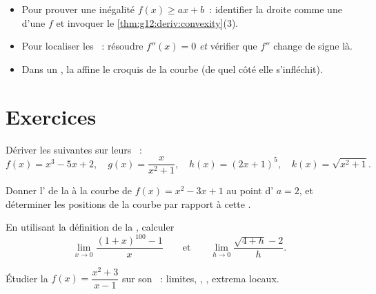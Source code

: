 \begin{method}\label{met:g12:deriv:convexity}
\begin{itemize}
  \item Pour prouver une inégalité $f(x) \geq ax + b$~: identifier la
        droite comme une  d'une   $f$ et invoquer le
        \cref{thm:g12:deriv:convexity}(3).
  \item Pour localiser les ~: résoudre $f''(x) = 0$
        \emph{et} vérifier que $f''$ change de signe là.
  \item Dans un , la  affine le croquis de
        la courbe (de quel côté elle s'infléchit).
\end{itemize}
\end{method}

\section{Exercices}

\begin{exercise}[$\star$]\label{exo:g12:deriv:1}
Dériver les  suivantes sur leurs ~:
\[
f(x) = x^3 - 5x + 2, \quad
g(x) = \frac{x}{x^2+1}, \quad
h(x) = (2x+1)^5, \quad
k(x) = \sqrt{x^2 + 1}.
\]
\end{exercise}

\begin{exercise}[$\star$]\label{exo:g12:deriv:2}
Donner l' de la  à la courbe de $f(x) = x^2 - 3x + 1$ au
point d' $a = 2$, et déterminer les positions de la courbe par
rapport à cette .
\end{exercise}

\begin{exercise}[$\star$]\label{exo:g12:deriv:3}
En utilisant la définition de la , calculer
\[
\lim_{x \to 0} \frac{(1+x)^{100} - 1}{x}
\qquad\text{et}\qquad
\lim_{h \to 0} \frac{\sqrt{4+h} - 2}{h}.
\]
\end{exercise}

\begin{exercise}[$\star\star$]\label{exo:g12:deriv:4}
Étudier la  $f(x) = \dfrac{x^2 + 3}{x - 1}$ sur son ~: limites, , , extrema locaux.
\end{exercise}

